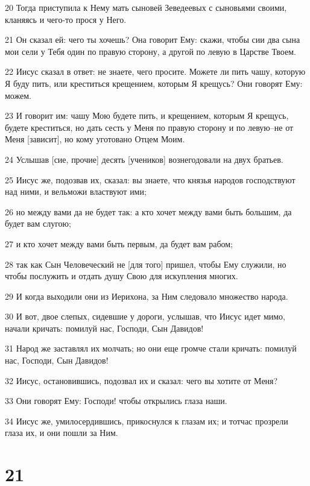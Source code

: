 \par 20 Тогда приступила к Нему мать сыновей Зеведеевых с сыновьями своими, кланяясь и чего-то прося у Него.
\par 21 Он сказал ей: чего ты хочешь? Она говорит Ему: скажи, чтобы сии два сына мои сели у Тебя один по правую сторону, а другой по левую в Царстве Твоем.
\par 22 Иисус сказал в ответ: не знаете, чего просите. Можете ли пить чашу, которую Я буду пить, или креститься крещением, которым Я крещусь? Они говорят Ему: можем.
\par 23 И говорит им: чашу Мою будете пить, и крещением, которым Я крещусь, будете креститься, но дать сесть у Меня по правую сторону и по левую--не от Меня [зависит], но кому уготовано Отцем Моим.
\par 24 Услышав [сие, прочие] десять [учеников] вознегодовали на двух братьев.
\par 25 Иисус же, подозвав их, сказал: вы знаете, что князья народов господствуют над ними, и вельможи властвуют ими;
\par 26 но между вами да не будет так: а кто хочет между вами быть большим, да будет вам слугою;
\par 27 и кто хочет между вами быть первым, да будет вам рабом;
\par 28 так как Сын Человеческий не [для того] пришел, чтобы Ему служили, но чтобы послужить и отдать душу Свою для искупления многих.
\par 29 И когда выходили они из Иерихона, за Ним следовало множество народа.
\par 30 И вот, двое слепых, сидевшие у дороги, услышав, что Иисус идет мимо, начали кричать: помилуй нас, Господи, Сын Давидов!
\par 31 Народ же заставлял их молчать; но они еще громче стали кричать: помилуй нас, Господи, Сын Давидов!
\par 32 Иисус, остановившись, подозвал их и сказал: чего вы хотите от Меня?
\par 33 Они говорят Ему: Господи! чтобы открылись глаза наши.
\par 34 Иисус же, умилосердившись, прикоснулся к глазам их; и тотчас прозрели глаза их, и они пошли за Ним.

\chapter{21}

